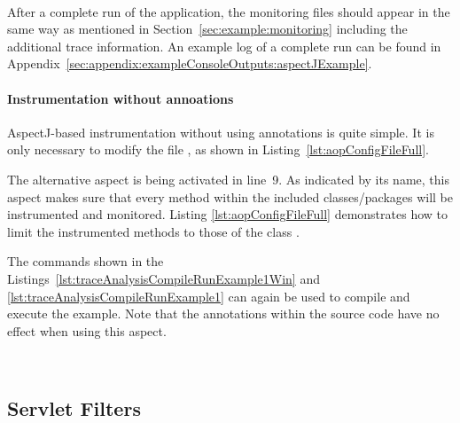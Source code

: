 \

\setBashListing



\noindent After a complete run of the application, the monitoring files should appear in %
the same way as mentioned in Section~\ref{sec:example:monitoring} including the %
additional trace information. An example log of a complete run can be found in %
Appendix~\ref{sec:appendix:exampleConsoleOutputs:aspectJExample}.

\paragraph*{Instrumentation without annoations}%

AspectJ-based instrumentation without using annotations is quite simple. It is %
only necessary to modify the file \file{\aopConfigFile{}}, as shown %
in Listing~\ref{lst:aopConfigFileFull}.

\setXMLListing


\noindent The alternative aspect  is being %
activated in line~9. As indicated by its name, this aspect makes sure that every %
method within the included classes/packages will be instrumented and monitored. %
Listing \ref{lst:aopConfigFileFull} demonstrates how to limit the %
instrumented methods to those of the class .

The commands shown in the Listings~\ref{lst:traceAnalysisCompileRunExample1Win} and %
\ref{lst:traceAnalysisCompileRunExample1} can again be used to compile and execute %
the example. Note that the annotations within the source code have no effect %
when using this aspect.

\


\subsection{Servlet Filters}\label{sec:traceAnalysis:instr:servlet}

